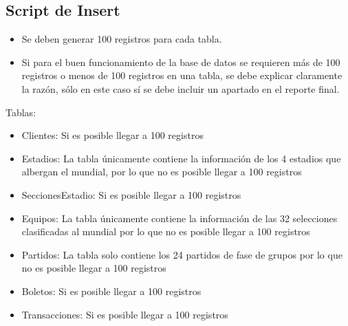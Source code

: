    
\subsection{Script de Insert}
\begin{itemize}
    \item Se deben generar 100 registros para cada tabla.
    \item Si para el buen funcionamiento de la base de datos se requieren más de 100 registros o
            menos de 100 registros en una tabla, se debe explicar claramente la razón, sólo en este caso
            sí se debe incluir un apartado en el reporte final.
\end{itemize}

Tablas:
\begin{itemize}
    \item Clientes: Si es posible llegar a 100 registros 
    \item Estadios: La tabla únicamente contiene la información de los 4 estadios que albergan el mundial, por lo que no es posible llegar a 100 registros
    \item SeccionesEstadio: Si es posible llegar a 100 registros 
    \item Equipos: La tabla únicamente contiene la información de las 32 selecciones clasificadas al mundial por lo que no es posible llegar a 100 registros
    \item Partidos: La tabla solo contiene los 24 partidos de fase de grupos por lo que no es posible llegar a 100 registros
    \item Boletos: Si es posible llegar a 100 registros 
    \item Transacciones: Si es posible llegar a 100 registros 
\end{itemize}